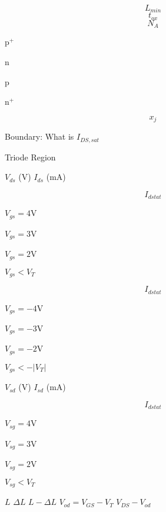 \documentclass[letterpaper 12pt]{book}
\begin{document}
\[ L_{min} \]
\[ t_{ox} \]
\[ N_A \]

p$^+$

n

p

n$^+$

\[ x_j \]


Boundary:  What is $ I_{DS,sat} $

Triode Region

$V_{ds}$ (V) 
$I_{ds}$ (mA)

\[ I_{dstat} \]

$ V_{gs} = 4$V

$ V_{gs} = 3$V

$ V_{gs} = 2$V

$ V_{gs} < V_T$



\[ I_{dstat} \]

$ V_{gs} = -4$V

$ V_{gs} = -3$V

$ V_{gs} = -2$V

$ V_{gs} < -|V_T|$


$V_{sd}$ (V) 
$I_{sd}$ (mA)

\[ I_{dstat} \]

$ V_{sg} = 4$V

$ V_{sg} = 3$V

$ V_{sg} = 2$V

$ V_{sg} < V_T$

$L $
$ \Delta L$
$ L - \Delta L$
$ V_{od} = V_{GS}-V_T $
$ V_{DS} - V_{od} $
\end{document}
